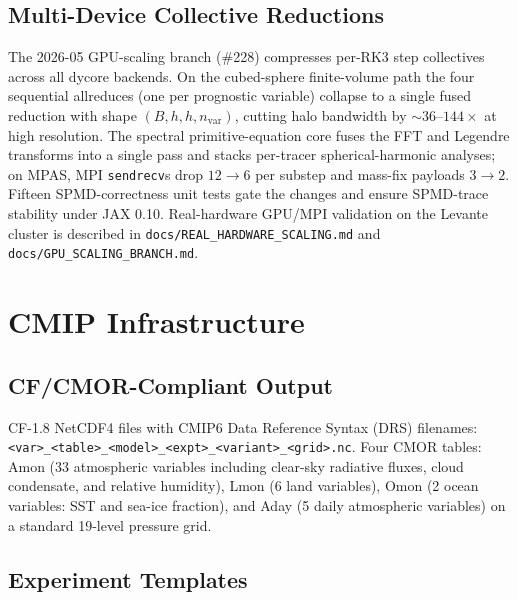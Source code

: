 \documentclass[11pt,twoside]{report}
\begin{document}
\section{Multi-Device Collective Reductions}
\label{sec:gpu-scaling}

The 2026-05 GPU-scaling branch (\#228) compresses per-RK3 step
collectives across all dycore backends.  On the cubed-sphere
finite-volume path the four sequential allreduces (one per
prognostic variable) collapse to a single fused reduction with
shape $(B,h,h,n_{\mathrm{var}})$, cutting halo bandwidth by
${\sim}36\text{--}144\times$ at high resolution.  The spectral
primitive-equation core fuses the FFT and Legendre transforms into a
single pass and stacks per-tracer spherical-harmonic analyses; on
MPAS, MPI \texttt{sendrecv}s drop $12\to 6$ per substep and
mass-fix payloads $3\to 2$.  Fifteen SPMD-correctness unit tests
gate the changes and ensure SPMD-trace stability under JAX 0.10.
Real-hardware GPU/MPI validation on the Levante cluster is
described in \texttt{docs/REAL\_HARDWARE\_SCALING.md} and
\texttt{docs/GPU\_SCALING\_BRANCH.md}.


\chapter{CMIP Infrastructure}
\label{ch:cmip}

\section{CF/CMOR-Compliant Output}

CF-1.8 NetCDF4 files with CMIP6 Data Reference Syntax (DRS) filenames:
\texttt{<var>\_<table>\_<model>\_<expt>\_<variant>\_<grid>.nc}.
Four CMOR tables: Amon (33 atmospheric variables including clear-sky
radiative fluxes, cloud condensate, and relative humidity), Lmon
(6 land variables), Omon (2 ocean variables: SST and sea-ice fraction),
and Aday (5 daily atmospheric variables) on a standard 19-level pressure
grid.

\section{Experiment Templates}
\end{document}

